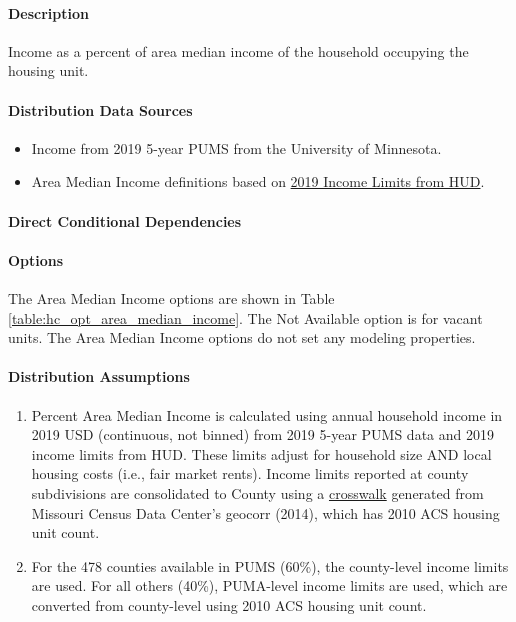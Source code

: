 \paragraph{Description}
% 
Income as a percent of area median income of the household occupying the housing unit.

\paragraph{Distribution Data Sources}
% 
\begin{itemize}
\item 
  Income from 2019 5-year PUMS from the University of Minnesota.
\item 
  Area Median Income definitions based on \href{https://www.huduser.gov/portal/datasets/il.html#data_2019}{2019 Income Limits from HUD}.
  
\end{itemize}

\paragraph{Direct Conditional Dependencies}


\paragraph{Options}
The Area Median Income options are shown in Table \ref{table:hc_opt_area_median_income}. The Not Available option is for vacant units. The Area Median Income options do not set any modeling properties.



\paragraph{Distribution Assumptions}
% 
\begin{enumerate}
\item
    Percent Area Median Income is calculated using annual household income in
  2019 USD (continuous, not binned) from 2019 5-year PUMS data and 2019
  income limits from HUD. These limits adjust for household size AND
  local housing costs (i.e., fair market rents). Income limits reported at
  county subdivisions are consolidated to County using a \href{https://mcdc.missouri.edu/applications/geocorr2014.html}{crosswalk}
  generated from Missouri Census Data Center's geocorr
  (2014), which has 2010 ACS housing unit count.
\item 
    For the 478 counties
    available in PUMS (60\%), the county-level income limits are used. For
    all others (40\%), PUMA-level income limits are used, which are
    converted from county-level using 2010 ACS housing unit count.
\end{enumerate}
